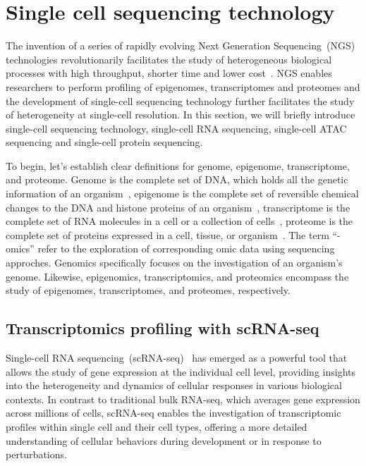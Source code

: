 \section{Single cell sequencing technology}
\label{background:profiling_singlecell}
The invention of a series of rapidly evolving Next Generation Sequencing~(NGS) technologies revolutionarily facilitates the study of heterogeneous biological processes with high throughput, shorter time and lower cost~\citep{svensson2018exponential}. NGS enables researchers to perform profiling of epigenomes, transcriptomes and proteomes and the development of single-cell sequencing technology further facilitates the study of heterogeneity at single-cell resolution. In this section, we will briefly introduce single-cell sequencing technology, single-cell RNA sequencing, single-cell ATAC sequencing and single-cell protein sequencing.

To begin, let's establish clear definitions for genome, epigenome, transcriptome, and proteome. Genome is the complete set of DNA, which holds all the genetic information of an organism~\citep{hubbard2002genome}, epigenome is the complete set of reversible chemical changes to the DNA and histone proteins of an organism~\citep{bernstein2007epigenome}, transcriptome is the complete set of RNA molecules in a cell or a collection of cells~\citep{haoudi2006proteome}, proteome is the complete set of proteins expressed in a cell, tissue, or organism~\citep{wang2009transcriptome}. The term “-omics” refer to the exploration of corresponding omic data using sequencing approches. Genomics specifically focuses on the investigation of an organism's genome. Likewise, epigenomics, transcriptomics, and proteomics encompass the study of epigenomes, transcriptomes, and proteomes, respectively.


\subsection{Transcriptomics profiling with scRNA-seq}
\label{background:sec1:scRNA}

Single-cell RNA sequencing~(scRNA-seq)~\citep{singlecellsequencing2014, singlecellsequencing2015} has emerged as a powerful tool that allows the study of gene expression at the individual cell level, providing insights into the heterogeneity and dynamics of cellular responses in various biological contexts. In contrast to traditional bulk RNA-seq, which averages gene expression across millions of cells, scRNA-seq enables the investigation of transcriptomic profiles within single cell and their cell types, offering a more detailed understanding of cellular behaviors during development or in response to perturbations.

